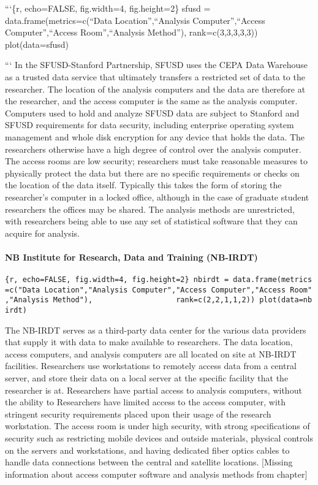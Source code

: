 ```\{r, echo=FALSE, fig.width=4, fig.height=2\} sfusd =
data.frame(metrics=c(``Data Location'',``Analysis Computer'',``Access
Computer'',``Access Room'',``Analysis Method''), rank=c(3,3,3,3,3))
plot(data=sfusd)

``` In the SFUSD-Stanford Partnership, SFUSD uses the CEPA Data
Warehouse as a trusted data service that ultimately transfers a
restricted set of data to the researcher. The location of the analysis
computers and the data are therefore at the researcher, and the access
computer is the same as the analysis computer. Computers used to hold
and analyze SFUSD data are subject to Stanford and SFUSD requirements
for data security, including enterprise operating system management and
whole disk encryption for any device that holds the data. The
researchers otherwise have a high degree of control over the analysis
computer. The access rooms are low security; researchers must take
reasonable measures to physically protect the data but there are no
specific requirements or checks on the location of the data itself.
Typically this takes the form of storing the researcher's computer in a
locked office, although in the case of graduate student researchers the
offices may be shared. The analysis methods are unrestricted, with
researchers being able to use any set of statistical software that they
can acquire for analysis.

\hypertarget{nb-institute-for-research-data-and-training-nb-irdt}{%
\paragraph{NB Institute for Research, Data and Training
(NB-IRDT)}\label{nb-institute-for-research-data-and-training-nb-irdt}}

\texttt{\{r,\ echo=FALSE,\ fig.width=4,\ fig.height=2\}\ nbirdt\ =\ data.frame(metrics=c("Data\ Location","Analysis\ Computer","Access\ Computer","Access\ Room","Analysis\ Method"),\ \ \ \ \ \ \ \ \ \ \ \ \ \ \ \ \ \ \ rank=c(2,2,1,1,2))\ plot(data=nbirdt)}

The NB-IRDT serves as a third-party data center for the various data
providers that supply it with data to make available to researchers. The
data location, access computers, and analysis computers are all located
on site at NB-IRDT facilities. Researchers use workstations to remotely
access data from a central server, and store their data on a local
server at the specific facility that the researcher is at. Researchers
have partial access to analysis computers, without the ability to
Researchers have limited access to the access computer, with stringent
security requirements placed upon their usage of the research
workstation. The access room is under high security, with strong
specifications of security such as restricting mobile devices and
outside materials, physical controls on the servers and workstations,
and having dedicated fiber optics cables to handle data connections
between the central and satellite locations. {[}Missing information
about access computer software and analysis methods from chapter{]}

